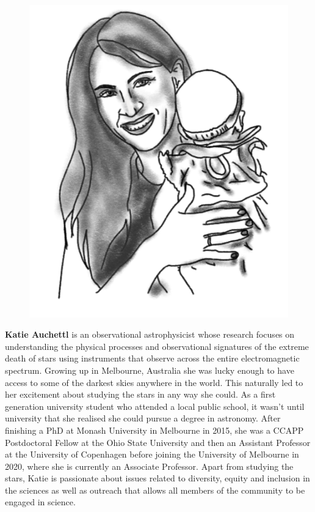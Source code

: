 \begin{figure}
\vspace{50pt}
\includegraphics[width=0.9\linewidth]{portraits/katie_a.png}
\end{figure}
\textbf{Katie Auchettl} is an observational astrophysicist whose research focuses on understanding the physical processes and observational signatures of the extreme death of stars using instruments that observe across the entire electromagnetic spectrum.  Growing up in Melbourne, Australia she was lucky enough to have access to some of the darkest skies anywhere in the world. This naturally led to her excitement about studying the stars in any way she could. As a first generation university student who attended a local public school, it wasn't until university that she realised she could pursue a degree in astronomy. After finishing a PhD at Monash University in Melbourne in 2015, she was a CCAPP Postdoctoral Fellow at the Ohio State University and then an Assistant Professor at the University of Copenhagen before joining the University of Melbourne in 2020, where she is currently an Associate Professor. Apart from studying the stars, Katie is passionate about issues related to diversity, equity and inclusion in the sciences as well as outreach that allows all members of the community to be engaged in science.\\
\\


